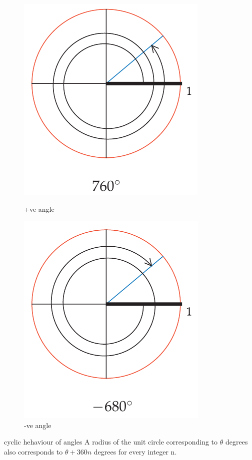 \documentclass{beamer}
\begin{document}
\begin{frame}
    \begin{figure}[h]    
        \begin{minipage}[b]{0.3\textwidth}
        \centering
        \includegraphics[scale=0.25]{3.png}
        \caption{+ve angle}
    \end{minipage}
    \begin{minipage}[b]{0.3\textwidth}
        \centering
        \includegraphics[scale=0.25]{4.png}
        \caption{-ve angle}
    \end{minipage}
\end{figure}
\begin{block}{cyclic hehaviour of angles}
    A radius of the unit circle corresponding to $\theta$ degrees also corresponds to
$\theta + 360n$ degrees for every integer n.
\end{block}
\end{frame}
\end{document}
